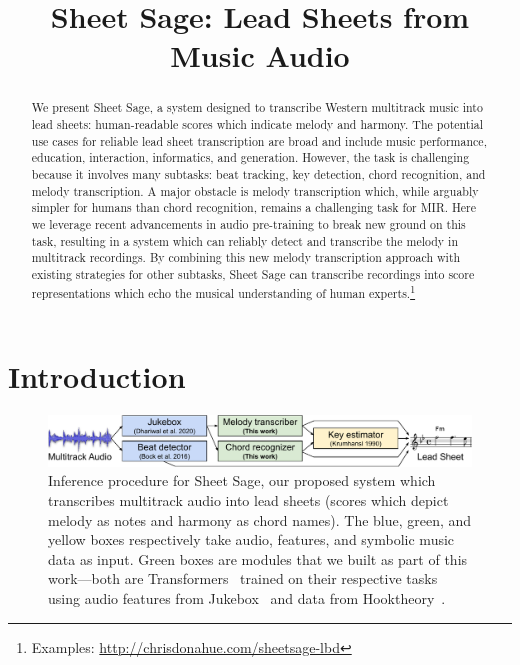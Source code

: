 \documentclass{article}
\title{
Sheet Sage: Lead Sheets from Music Audio
}
\begin{document}
\maketitle

\begin{abstract}

We present Sheet Sage, 
a system designed to transcribe Western multitrack music into lead sheets: human-readable scores which indicate melody and harmony. 
The potential use cases for reliable lead sheet transcription are broad and include 
music performance, 
education, 
interaction, 
informatics, 
and generation. 
However, the task is challenging because it involves many subtasks: 
beat tracking, 
key detection, 
chord recognition,
and melody transcription. 
A major obstacle is melody transcription which, 
while arguably simpler for humans than chord recognition, 
remains a challenging task for MIR. 
Here we leverage recent advancements in audio pre-training to break new ground on this task, 
resulting in a system which can reliably detect and transcribe the melody in multitrack recordings. 
By combining this new melody transcription approach with existing strategies for other subtasks, 
Sheet Sage can transcribe recordings into score representations which echo the musical understanding of human experts.\footnote{Examples: \url{http://chrisdonahue.com/sheetsage-lbd}}
\end{abstract}

\section{Introduction}\label{sec:introduction}

\begin{figure}
    \centering
    \includegraphics[width=\linewidth]{figs/one.pdf}
    \caption{Inference procedure for Sheet Sage, our proposed system which transcribes multitrack audio into lead sheets (scores which depict melody as notes and harmony as chord names). The blue, green, and yellow boxes respectively take audio, features, and symbolic music data as input. Green boxes are modules that we built as part of this work---both are Transformers~\cite{vaswani2017attention} trained on their respective tasks using audio features from Jukebox~\cite{dhariwal2020jukebox} and data from Hooktheory~\cite{hooktheory}.}
    \label{fig:one}
\end{figure}
\end{document}
